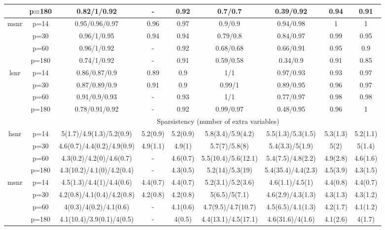 \begin{table}[ht]
{\begin{tabular}{|c|c|ccccccc|}
   & p=180 & 0.82/1/0.92 & - & 0.92 & 0.7/0.7 & 0.39/0.92 & 0.94 & 0.91 \\ 
  \midrule\multirow{4}[2]{*}{msnr} & p=14 & 0.95/0.96/0.97 & 0.96 & 0.97 & 0.9/0.9 & 0.94/0.98 & 1 & 1 \\ 
   & p=30 & 0.96/1/0.95 & 0.94 & 0.94 & 0.79/0.8 & 0.84/0.97 & 0.99 & 0.95 \\ 
   & p=60 & 0.96/1/0.92 & - & 0.92 & 0.68/0.68 & 0.66/0.91 & 0.95 & 0.9 \\ 
   & p=180 & 0.74/1/0.92 & - & 0.91 & 0.59/0.58 & 0.34/0.9 & 0.91 & 0.85 \\ 
  \midrule\multirow{4}[2]{*}{lsnr} & p=14 & 0.86/0.87/0.9 & 0.89 & 0.9 & 1/1 & 0.97/0.93 & 0.93 & 0.97 \\ 
   & p=30 & 0.87/0.89/0.9 & 0.91 & 0.9 & 0.99/1 & 0.89/0.95 & 0.96 & 0.97 \\ 
   & p=60 & 0.91/0.9/0.93 & - & 0.93 & 1/1 & 0.77/0.97 & 0.98 & 0.98 \\ 
   & p=180 & 0.78/0.91/0.92 & - & 0.92 & 0.99/0.97 & 0.48/0.95 & 0.96 & 1 \\ 
   \midrule 
 \multicolumn{1}{|c}{} &       & \multicolumn{7}{c|}{Sparsistency (number of extra variables)} \\
\midrule\multirow{4}[2]{*}{hsnr} & p=14 & 5(1.7)/4.9(1.3)/5.2(0.9) & 5.2(0.9) & 5.2(0.9) & 5.8(3.4)/5.9(4.2) & 5.5(1.3)/5.3(1.5) & 5.3(1.3) & 5.2(1.1) \\ 
   & p=30 & 4.6(0.7)/4.4(0.2)/4.9(0.9) & 4.9(1.1) & 4.9(1) & 5.7(7)/5.8(8) & 5.4(3.3)/5(1.9) & 5(2) & 5(1.4) \\ 
   & p=60 & 4.3(0.2)/4.2(0)/4.6(0.7) & - & 4.6(0.7) & 5.5(10.4)/5.6(12.1) & 5.4(7.5)/4.8(2.2) & 4.9(2.8) & 4.6(1.6) \\ 
   & p=180 & 4.3(10.2)/4.1(0)/4.2(0.4) & - & 4.3(0.5) & 5.2(14)/5.3(19) & 5.4(35.4)/4.4(2.3) & 4.5(3.9) & 4.3(1.5) \\ 
  \midrule\multirow{4}[2]{*}{msnr} & p=14 & 4.5(1.3)/4.4(1)/4.4(0.6) & 4.4(0.7) & 4.4(0.7) & 5.2(3.1)/5.2(3.6) & 4.6(1.1)/4.5(1) & 4.4(0.8) & 4.4(0.7) \\ 
   & p=30 & 4.2(0.8)/4.1(0.4)/4.2(0.8) & 4.2(0.8) & 4.2(0.8) & 5(6.5)/5(7.1) & 4.6(2.9)/4.3(1.3) & 4.3(1.3) & 4.3(1.2) \\ 
   & p=60 & 4(0.3)/4(0.2)/4.1(0.6) & - & 4.1(0.6) & 4.7(9.5)/4.7(10.7) & 4.5(6.5)/4.1(1.3) & 4.2(1.7) & 4.1(1.2) \\ 
   & p=180 & 4.1(10.4)/3.9(0.1)/4(0.5) & - & 4(0.5) & 4.4(13.1)/4.5(17.1) & 4.6(31.6)/4(1.6) & 4.1(2.6) & 4(1.7) \\ 

\end{tabular}}
\end{table}
